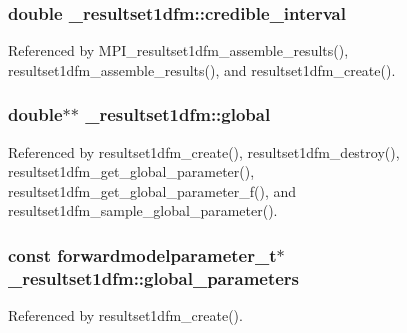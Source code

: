 \subsubsection[{\texorpdfstring{credible\+\_\+interval}{credible_interval}}]{\setlength{\rightskip}{0pt plus 5cm}double \+\_\+resultset1dfm\+::credible\+\_\+interval}\hypertarget{struct__resultset1dfm_a0680986edd1f0b2afb06b6f02d68e736}{}\label{struct__resultset1dfm_a0680986edd1f0b2afb06b6f02d68e736}


Referenced by M\+P\+I\+\_\+resultset1dfm\+\_\+assemble\+\_\+results(), resultset1dfm\+\_\+assemble\+\_\+results(), and resultset1dfm\+\_\+create().

\subsubsection[{\texorpdfstring{global}{global}}]{\setlength{\rightskip}{0pt plus 5cm}double$\ast$$\ast$ \+\_\+resultset1dfm\+::global}\hypertarget{struct__resultset1dfm_a0e078ab646d4c91612604d3fdd2dba92}{}\label{struct__resultset1dfm_a0e078ab646d4c91612604d3fdd2dba92}


Referenced by resultset1dfm\+\_\+create(), resultset1dfm\+\_\+destroy(), resultset1dfm\+\_\+get\+\_\+global\+\_\+parameter(), resultset1dfm\+\_\+get\+\_\+global\+\_\+parameter\+\_\+f(), and resultset1dfm\+\_\+sample\+\_\+global\+\_\+parameter().

\subsubsection[{\texorpdfstring{global\+\_\+parameters}{global_parameters}}]{\setlength{\rightskip}{0pt plus 5cm}const {\bf forwardmodelparameter\+\_\+t}$\ast$ \+\_\+resultset1dfm\+::global\+\_\+parameters}\hypertarget{struct__resultset1dfm_ac0512f402d548dc832a201bad68d9dad}{}\label{struct__resultset1dfm_ac0512f402d548dc832a201bad68d9dad}


Referenced by resultset1dfm\+\_\+create().

